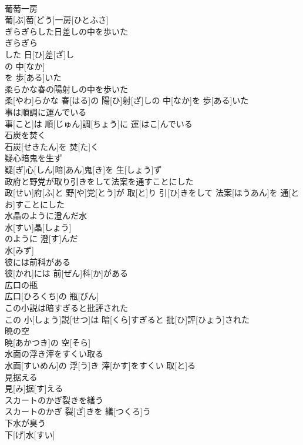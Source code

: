 \documentclass[8pt]{extreport}
\begin{document}
\begin{CJK}{UTF8}{min}
\\	葡萄一房	
\\	葡[ぶ]萄[どう]一房[ひとふさ]
\\	ぎらぎらした日差しの中を歩いた	
\\	ぎらぎら 
\\	した 日[ひ]差[ざ]し 
\\	の 中[なか]
\\	を 歩[ある]いた 
\\	柔らかな春の陽射しの中を歩いた	
\\	柔[やわ]らかな 春[はる]の 陽[ひ]射[ざ]しの 中[なか]を 歩[ある]いた
\\	事は順調に運んでいる	
\\	事[こと]は 順[じゅん]調[ちょう]に 運[はこ]んでいる
\\	石炭を焚く	
\\	石炭[せきたん]を 焚[た]く
\\	疑心暗鬼を生ず	
\\	疑[ぎ]心[しん]暗[あん]鬼[き]を 生[しょう]ず
\\	政府と野党が取り引きをして法案を通すことにした	
\\	政[せい]府[ふ]と 野[や]党[とう]が 取[と]り 引[ひ]きをして 法案[ほうあん]を 通[とお]すことにした
\\	水晶のように澄んだ水	
\\	水[すい]晶[しょう]
\\	のように 澄[す]んだ 
\\	水[みず]
\\	彼には前科がある	
\\	彼[かれ]には 前[ぜん]科[か]がある
\\	広口の瓶	
\\	広口[ひろくち]の 瓶[びん]
\\	この小説は暗すぎると批評された	
\\	この 小[しょう]説[せつ]は 暗[くら]すぎると 批[ひ]評[ひょう]された
\\	暁の空	
\\	暁[あかつき]の 空[そら]
\\	水面の浮き滓をすくい取る	
\\	水面[すいめん]の 浮[う]き 滓[かす]をすくい 取[と]る
\\	見据える	
\\	見[み]据[す]える
\\	スカートのかぎ裂きを繕う	
\\	スカートのかぎ 裂[ざ]きを 繕[つくろ]う
\\	下水が臭う	
\\	下[げ]水[すい]

\end{CJK}
\end{document}
